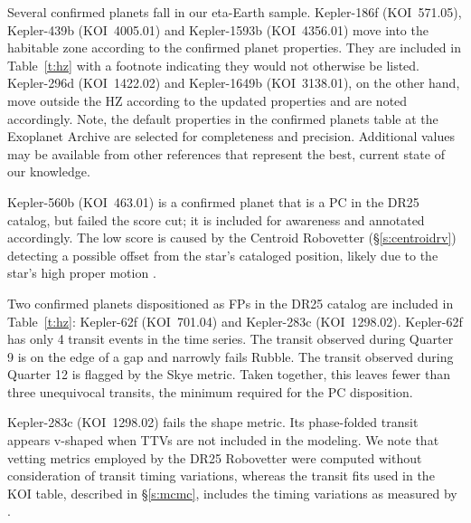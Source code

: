 Several confirmed planets fall in our eta-Earth sample.  Kepler-186f (KOI~571.05), Kepler-439b (KOI~4005.01) and Kepler-1593b (KOI~4356.01) move into the habitable zone according to the confirmed planet properties. They are included in Table~\ref{t:hz} with a footnote indicating they would not otherwise be listed. Kepler-296d (KOI~1422.02) and Kepler-1649b (KOI~3138.01), on the other hand, move outside the HZ according to the updated properties and are noted accordingly. Note, the default properties in the confirmed planets table at the Exoplanet Archive are selected for completeness and precision. Additional values may be available from other references that represent the best, current state of our knowledge.

Kepler-560b (KOI~463.01) is a confirmed planet that is a PC in the DR25 catalog, but failed the score cut; it is included for awareness and annotated accordingly.  The low score is caused by the Centroid Robovetter (\S\ref{s:centroidrv}) detecting a possible offset from the star's cataloged position, likely due to the star's high proper motion \citep{Mann2017}.  

Two confirmed planets dispositioned as FPs in the DR25 catalog are included in Table~\ref{t:hz}: Kepler-62f (KOI~701.04) and Kepler-283c (KOI~1298.02).  Kepler-62f has only 4 transit events in the time series.  The transit observed during Quarter 9 is on the edge of a gap and narrowly fails Rubble.  The transit observed during Quarter 12 is flagged by the Skye metric.  Taken together, this leaves fewer than three unequivocal transits, the minimum required for the PC disposition. 

Kepler-283c (KOI~1298.02) fails the shape metric.  Its phase-folded transit appears v-shaped when TTVs are not included in the modeling.  We note that vetting metrics employed by the DR25 Robovetter were computed without consideration of transit timing variations, whereas the transit fits used in the KOI table, described in \S\ref{s:mcmc}, includes the timing variations as measured by \citet{Rowe2015cat}. 

